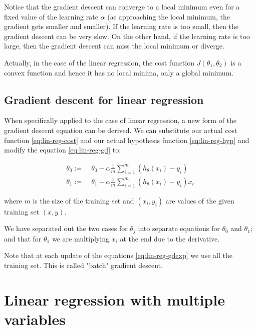 \documentclass[a4paper,11pt]{report}
\begin{document}
Notice that the gradient descent can converge to a local minimum even for a fixed value of the learning rate $\alpha$ (as approaching the local minimum, the gradient gets smaller and smaller).
If the learning rate is too small, then the gradient descent can be very slow. On the other hand, if the learning rate is too large, then the gradient descent can miss the local minimum or diverge.

Actually, in the case of the linear regression, the cost function $J(\theta_1, \theta_2)$ is a convex function and hence it has no local minima, only a global minimum.

\subsection*{Gradient descent for linear regression}

When specifically applied to the case of linear regression, a new form of the gradient descent equation can be derived. We can substitute our actual cost function \eqref{eq:lin-reg-cost}
and our actual hypothesis function \eqref{eq:lin-reg-hyp} and modify the equation \eqref{eq:lin-reg-gd} to:

\begin{equation}\label{eq:lin-reg-gdexp}
\begin{split}
  \theta_0 := & \;\theta_0 - \alpha \frac{1}{m} \sum\limits_{i=1}^{m}(h_\theta(x_{i}) - y_{i}) \\
  \theta_1 := & \;\theta_1 - \alpha \frac{1}{m} \sum\limits_{i=1}^{m}(h_\theta(x_{i}) - y_{i}) x_{i}
\end{split}
\end{equation}

where $m$ is the size of the training set and $(x_{i}, y_{i})$ are values of the given training set $(x, y)$.

We have separated out the two cases for $\theta_j$ into separate equations for $\theta_0$ and $\theta_1$; and that for $\theta_1$ we are multiplying $x_{i}$ at the end due to the derivative.

Note that at each update of the equations \eqref{eq:lin-reg-gdexp} we use all the training set. This is called "batch" gradient descent.



\section{Linear regression with multiple variables}\label{sec:mul-reg}
\end{document}
